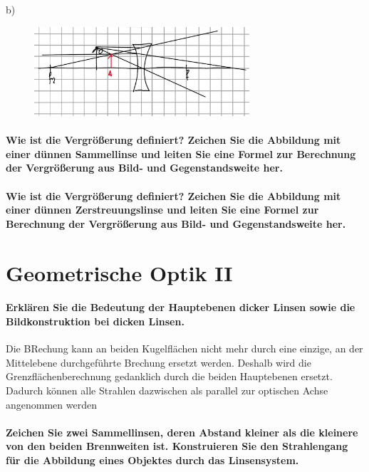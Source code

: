 \documentclass[a4paper, 11pt, ngerman, parskip=half-]{scrartcl}
\begin{document}
b)
\begin{figure}[H]
    \centering
    \includegraphics[width=8cm]{image/17/geo16b}
\end{figure}








\paragraph{Wie ist die Vergrößerung definiert? Zeichen Sie die Abbildung mit einer dünnen
Sammellinse und leiten Sie eine Formel zur Berechnung der Vergrößerung aus Bild- und
Gegenstandsweite her.}

\paragraph{Wie ist die Vergrößerung definiert? Zeichen Sie die Abbildung mit einer dünnen
Zerstreuungslinse und leiten Sie eine Formel zur Berechnung der Vergrößerung aus Bild- und
Gegenstandsweite her.}

\newpage

\section{Geometrische Optik II}

\paragraph{Erklären Sie die Bedeutung der Hauptebenen dicker Linsen sowie die Bildkonstruktion bei
dicken Linsen.}

Die BRechung kann an beiden Kugelflächen nicht mehr durch eine einzige, an der Mittelebene durchgeführte Brechung ersetzt werden. Deshalb wird die Grenzflächenberechnung gedanklich durch die beiden Hauptebenen ersetzt. Dadurch können alle Strahlen dazwischen als parallel zur optischen Achse angenommen werden

\paragraph{Zeichen Sie zwei Sammellinsen, deren Abstand kleiner als die kleinere von den beiden
Brennweiten ist. Konstruieren Sie den Strahlengang für die Abbildung eines Objektes durch
das Linsensystem.}
\end{document}
